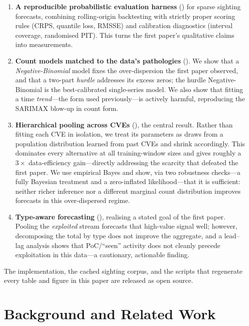 \documentclass[]{article}
\begin{document}
\begin{enumerate}
  \item \textbf{A reproducible probabilistic evaluation harness}
  () for sparse sighting forecasts, combining rolling-origin
  backtesting with strictly proper scoring rules (CRPS, quantile loss, RMSSE)
  and calibration diagnostics (interval coverage, randomised PIT). This turns the
  first paper's qualitative claims into measurements.

  \item \textbf{Count models matched to the data's pathologies}
  (). We show that a \emph{Negative-Binomial} model
  fixes the over-dispersion the first paper observed, and that a two-part
  \emph{hurdle} addresses its excess zeros; the hurdle Negative-Binomial is the
  best-calibrated single-series model. We also show that fitting a time
  \emph{trend}---the form used previously---is actively harmful, reproducing the
  SARIMAX blow-up in count form.

  \item \textbf{Hierarchical pooling across CVEs} (), the
  central result. Rather than fitting each CVE in isolation, we treat its
  parameters as draws from a population distribution learned from past CVEs and
  shrink accordingly. This dominates every alternative at all training-window
  sizes and gives roughly a $3\times$ data-efficiency gain---directly addressing
  the scarcity that defeated the first paper. We use empirical Bayes and show, via
  two robustness checks---a fully Bayesian treatment and a zero-inflated
  likelihood---that it is sufficient: neither richer inference nor a different
  marginal count distribution improves forecasts in this over-dispersed regime.

  \item \textbf{Type-aware forecasting} (), realising a stated
  goal of the first paper. Pooling the \emph{exploited} stream forecasts that
  high-value signal well; however, decomposing the total by type does not improve
  the aggregate, and a lead--lag analysis shows that PoC/``seen'' activity does
  not cleanly precede exploitation in this data---a cautionary, actionable
  finding.
\end{enumerate}

\noindent The implementation, the cached sighting corpus, and the scripts that
regenerate every table and figure in this paper are released as open source.

\section{Background and Related Work}
\end{document}
